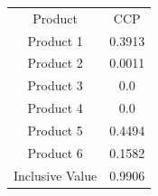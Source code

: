 \begin{tabular}{cc}
Product & CCP \\
Product 1 & 0.3913 \\
Product 2 & 0.0011 \\
Product 3 & 0.0 \\
Product 4 & 0.0 \\
Product 5 & 0.4494 \\
Product 6 & 0.1582 \\
Inclusive Value & 0.9906 \\
\end{tabular}